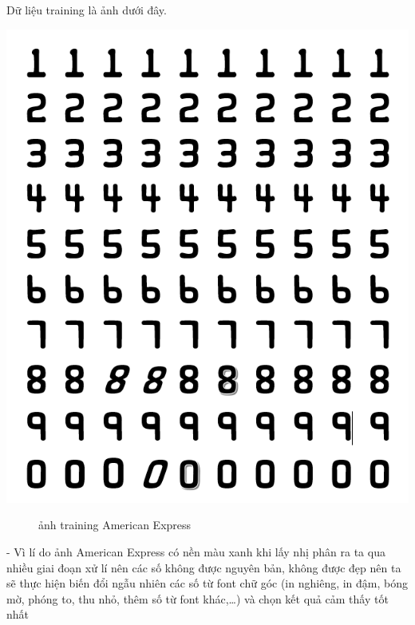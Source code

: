     \quad Dữ liệu training là ảnh dưới đây.
\begin{center}
    \includegraphics[scale = 0.5]{images/americanexpress/training.png}
\end{center}
\begin{figure}[htp]
    \caption{ảnh training American Express}
\end{figure}

-	Vì lí do ảnh American Express có nền màu xanh khi lấy nhị phân ra ta qua nhiều giai đoạn xử lí nên các số không được nguyên bản, không được đẹp nên ta sẽ thực hiện biến đổi ngẫu nhiên các số từ font chữ góc (in nghiêng, in đậm, bóng mờ, phóng to, thu nhỏ, thêm số từ font khác,…) và chọn kết quả cảm thấy tốt nhất \\[0.3cm]


